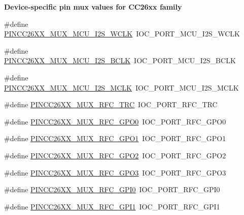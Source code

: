 \begin{Indent}{\bf Device-\/specific pin mux values for C\+C26xx family}
\begin{DoxyCompactItemize}
\item 
\#define \hyperlink{_p_i_n_c_c26_x_x_8h_ab79ff812095158eced35716d506be08e}{P\+I\+N\+C\+C26\+X\+X\+\_\+\+M\+U\+X\+\_\+\+M\+C\+U\+\_\+\+I2\+S\+\_\+\+W\+C\+L\+K}~I\+O\+C\+\_\+\+P\+O\+R\+T\+\_\+\+M\+C\+U\+\_\+\+I2\+S\+\_\+\+W\+C\+L\+K
\item 
\#define \hyperlink{_p_i_n_c_c26_x_x_8h_a1ca04c323c59730e77a057e750844564}{P\+I\+N\+C\+C26\+X\+X\+\_\+\+M\+U\+X\+\_\+\+M\+C\+U\+\_\+\+I2\+S\+\_\+\+B\+C\+L\+K}~I\+O\+C\+\_\+\+P\+O\+R\+T\+\_\+\+M\+C\+U\+\_\+\+I2\+S\+\_\+\+B\+C\+L\+K
\item 
\#define \hyperlink{_p_i_n_c_c26_x_x_8h_ae41e6f48afb4b7b06fac72ef98dd1866}{P\+I\+N\+C\+C26\+X\+X\+\_\+\+M\+U\+X\+\_\+\+M\+C\+U\+\_\+\+I2\+S\+\_\+\+M\+C\+L\+K}~I\+O\+C\+\_\+\+P\+O\+R\+T\+\_\+\+M\+C\+U\+\_\+\+I2\+S\+\_\+\+M\+C\+L\+K
\item 
\#define \hyperlink{_p_i_n_c_c26_x_x_8h_a4b9269f9eac469a814f20ac6f96196a9}{P\+I\+N\+C\+C26\+X\+X\+\_\+\+M\+U\+X\+\_\+\+R\+F\+C\+\_\+\+T\+R\+C}~I\+O\+C\+\_\+\+P\+O\+R\+T\+\_\+\+R\+F\+C\+\_\+\+T\+R\+C
\item 
\#define \hyperlink{_p_i_n_c_c26_x_x_8h_a89e0489423caa21a1e6339e018d925f2}{P\+I\+N\+C\+C26\+X\+X\+\_\+\+M\+U\+X\+\_\+\+R\+F\+C\+\_\+\+G\+P\+O0}~I\+O\+C\+\_\+\+P\+O\+R\+T\+\_\+\+R\+F\+C\+\_\+\+G\+P\+O0
\item 
\#define \hyperlink{_p_i_n_c_c26_x_x_8h_aab76af2130f96f3da07131cfd232ce71}{P\+I\+N\+C\+C26\+X\+X\+\_\+\+M\+U\+X\+\_\+\+R\+F\+C\+\_\+\+G\+P\+O1}~I\+O\+C\+\_\+\+P\+O\+R\+T\+\_\+\+R\+F\+C\+\_\+\+G\+P\+O1
\item 
\#define \hyperlink{_p_i_n_c_c26_x_x_8h_a144116dadf2ba363c54c7d2507abe54e}{P\+I\+N\+C\+C26\+X\+X\+\_\+\+M\+U\+X\+\_\+\+R\+F\+C\+\_\+\+G\+P\+O2}~I\+O\+C\+\_\+\+P\+O\+R\+T\+\_\+\+R\+F\+C\+\_\+\+G\+P\+O2
\item 
\#define \hyperlink{_p_i_n_c_c26_x_x_8h_adc5890a2a1333e956349ed23bbe49d10}{P\+I\+N\+C\+C26\+X\+X\+\_\+\+M\+U\+X\+\_\+\+R\+F\+C\+\_\+\+G\+P\+O3}~I\+O\+C\+\_\+\+P\+O\+R\+T\+\_\+\+R\+F\+C\+\_\+\+G\+P\+O3
\item 
\#define \hyperlink{_p_i_n_c_c26_x_x_8h_acb09fb065bb0d5951baa8a6441471854}{P\+I\+N\+C\+C26\+X\+X\+\_\+\+M\+U\+X\+\_\+\+R\+F\+C\+\_\+\+G\+P\+I0}~I\+O\+C\+\_\+\+P\+O\+R\+T\+\_\+\+R\+F\+C\+\_\+\+G\+P\+I0
\item 
\#define \hyperlink{_p_i_n_c_c26_x_x_8h_a71f92d2ec8410256434ce0968476a749}{P\+I\+N\+C\+C26\+X\+X\+\_\+\+M\+U\+X\+\_\+\+R\+F\+C\+\_\+\+G\+P\+I1}~I\+O\+C\+\_\+\+P\+O\+R\+T\+\_\+\+R\+F\+C\+\_\+\+G\+P\+I1
\end{DoxyCompactItemize}
\end{Indent}
